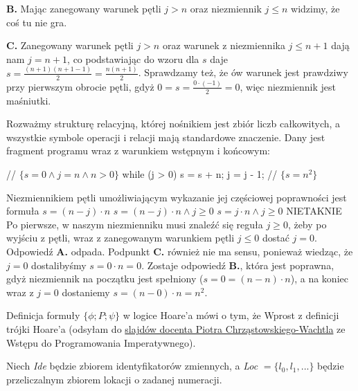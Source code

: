 \begin{solutions}
    \textbf{B.} Mając zanegowany warunek pętli $j>n$ oraz niezmiennik $j\leq n$ widzimy, że coś tu nie gra.

    \textbf{C.} Zanegowany warunek pętli $j>n$ oraz warunek z niezmiennika $j\leq n+1$ dają nam $j=n+1$, co podstawiając do wzoru dla $s$ daje $s=\frac{(n+1)(n+1-1)}{2}=\frac{n(n+1)}{2}$. Sprawdzamy też, że ów warunek jest prawdziwy przy pierwszym obrocie pętli, gdyż $0=s=\frac{0\cdot(-1)}{2}=0$, więc niezmiennik jest maśniutki. 

    \sol Rozważmy strukturę relacyjną, której nośnikiem jest zbiór liczb całkowitych, a wszystkie symbole operacji i relacji mają standardowe znaczenie. Dany jest fragment programu wraz z warunkiem wstępnym i końcowym:
    \begin{cpp}
        // $\{s = 0 \land j = n \land n > 0\}$
        while (j > 0) {
            s = s + n;
            j = j - 1;
        }
        // $\{s = n^2\}$
    \end{cpp}
    Niezmiennikiem pętli umożliwiającym wykazanie jej częściowej poprawności jest formuła
    \answerss
    {$s = (n - j) \cdot n$}
    {$s = (n - j) \cdot n \wedge j \geq 0$}
    {$s = j \cdot n \wedge j \geq 0$}
    {NIE}{TAK}{NIE}
    Po pierwsze, w naszym niezmienniku musi znaleźć się reguła $j\geq0$, żeby po wyjściu z pętli, wraz z zanegowanym warunkiem pętli $j\leq0$ dostać $j=0$. Odpowiedź \textbf{A.} odpada. Podpunkt \textbf{C.} również nie ma sensu, ponieważ wiedząc, że $j=0$ dostalibyśmy $s=0\cdot n=0$. Zostaje odpowiedź \textbf{B.}, która jest poprawna, gdyż niezmiennik na początku jest spełniony ($s=0=(n-n)\cdot n$), a na koniec wraz z $j=0$ dostaniemy $s=(n-0)\cdot n=n^2$.

    \sol Definicja formuły $\{\phi; P; \psi\}$ w logice Hoare’a mówi o tym, że
    Wprost z definicji trójki Hoare'a (odsyłam do \href{https://moodle.mimuw.edu.pl/pluginfile.php/92777/mod_resource/content/1/PoprawnoscHoareC.pdf}{slajdów docenta Piotra Chrząstowskiego-Wachtla} ze Wstępu do Programowania Imperatywnego).

    \sol Niech \textit{Ide} będzie zbiorem identyfikatorów zmiennych, a \textit{Loc} $= \{l_0, l_1, ...\}$ będzie przeliczalnym zbiorem lokacji o zadanej numeracji.
    

\end{solutions}

